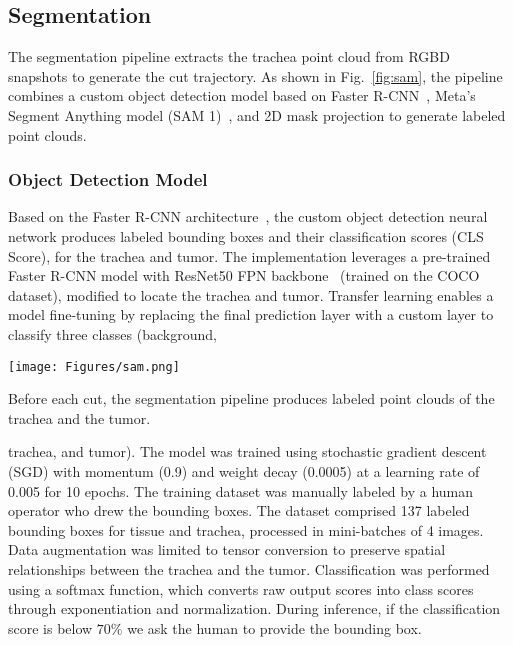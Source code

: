 \subsection{Segmentation}
The segmentation pipeline extracts the trachea point cloud from RGBD snapshots to generate the cut trajectory. As shown in Fig.~\ref{fig:sam}, the pipeline combines a custom object detection model based on Faster R-CNN~\cite{ren2015faster}, Meta's Segment Anything model (SAM 1)~\cite{kirillov2023segment}, and 2D mask projection to generate labeled point clouds.


\subsubsection{Object Detection Model}
Based on the Faster R-CNN architecture~\cite{ren2015faster}, the custom object detection neural network produces labeled bounding boxes and their classification scores (CLS Score), for the trachea and tumor. The implementation leverages a pre-trained Faster R-CNN model with ResNet50 FPN backbone~\cite{he2015deep} (trained on the COCO dataset), modified to locate the trachea and tumor. Transfer learning enables a model fine-tuning by replacing the final prediction layer with a custom layer to classify three classes (background, 

\vspace{1em}
\begin{figurehere}
    \centering
    \texttt{[image: Figures/sam.png]}
    \caption{Before each cut, the segmentation pipeline produces labeled point clouds of the trachea and the tumor. }
    \label{fig:sam}
\end{figurehere}

\noindent trachea, and tumor).
The model was trained using stochastic gradient descent (SGD) with momentum (0.9) and weight decay (0.0005) at a learning rate of 0.005 for 10 epochs. The training dataset was manually labeled by a human operator who drew the bounding boxes. The dataset comprised 137 labeled bounding boxes for tissue and trachea, processed in mini-batches of 4 images. Data augmentation was limited to tensor conversion to preserve spatial relationships between the trachea and the tumor. Classification was performed using a softmax function, which converts raw output scores into class scores through exponentiation and normalization. During inference, if the classification score is below $70\%$ we ask the human to provide the bounding box.




